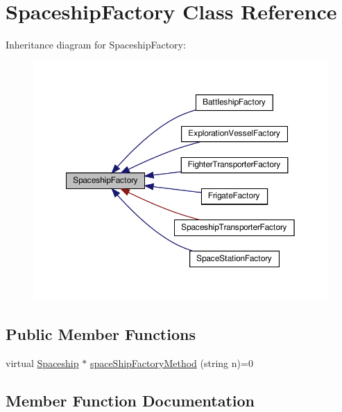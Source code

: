 \hypertarget{classSpaceshipFactory}{}\section{Spaceship\+Factory Class Reference}
\label{classSpaceshipFactory}


Inheritance diagram for Spaceship\+Factory\+:\nopagebreak
\begin{figure}[H]
\begin{center}
\leavevmode
\includegraphics[width=350pt]{classSpaceshipFactory__inherit__graph}
\end{center}
\end{figure}
\subsection*{Public Member Functions}
\begin{DoxyCompactItemize}
\item 
virtual \hyperlink{classSpaceship}{Spaceship} $\ast$ \hyperlink{classSpaceshipFactory_a70b50dd616cb16f50088eff9ca07cda9}{space\+Ship\+Factory\+Method} (string n)=0
\end{DoxyCompactItemize}


\subsection{Member Function Documentation}
\mbox{\label{classSpaceshipFactory_a70b50dd616cb16f50088eff9ca07cda9}} 
